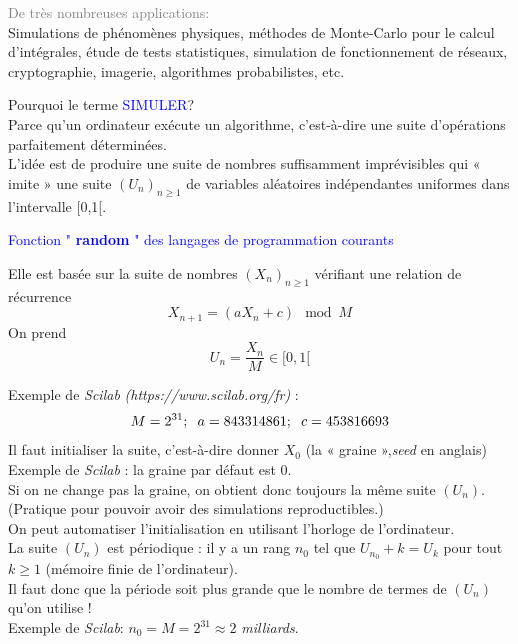 \textcolor{gray}{De très nombreuses applications: \\}
Simulations de phénomènes physiques, méthodes de
Monte-Carlo pour le calcul d'intégrales, étude de tests
statistiques, simulation de fonctionnement de réseaux,
cryptographie, imagerie, algorithmes probabilistes, etc. \\
\vspace{0.5cm}

Pourquoi le terme \textcolor{blue}{SIMULER}? \\
Parce qu'un ordinateur exécute un algorithme, c'est-à-dire une suite d'opérations parfaitement déterminées.\\
L'idée est de produire une suite de nombres suffisamment
imprévisibles qui « imite » une suite $(U_{n})_{n \geq 1}$ de variables aléatoires indépendantes uniformes dans l'intervalle [0,1[.\\

\vspace{1cm}

\begin{Large}
\colorbox{gray!20}{\textcolor{blue}{Fonction " \textbf{random} " des langages de programmation
courants}}
\end{Large}

Elle est basée sur la suite de nombres $(X_{n})_{n \geq 1}$ vérifiant une relation de récurrence
\[ X_{n+1} = (a X_{n}+ c) \mod M \]
On prend
\[ U_{n} = \dfrac{X_{n}}{M} \in [0,1[ \]

Exemple de \textit{Scilab} \emph{(https://www.scilab.org/fr)} : \\
\[ M = 2^{31} ; \hspace{2mm} a= 843 314 861; \hspace{2mm} c= 453 816 693 \]
\vspace{2mm}
Il faut initialiser la suite, c'est-à-dire donner $X_{0}$ (la « graine »,\textit{seed} en anglais)\\
\vspace{1mm}
Exemple de \textit{Scilab} : la graine par défaut est 0.\\
\vspace{1mm}
Si on ne change pas la graine, on obtient donc toujours la même suite $(U_{n})$. (Pratique pour pouvoir avoir des simulations reproductibles.)\\
\vspace{1mm}
On peut automatiser l'initialisation en utilisant l'horloge de l'ordinateur.\\
\vspace{1mm}
La suite $(U_{n})$ est périodique : il y a un rang $n_{0}$ tel que $U_{n_{0}} +k = U_{k}$ pour tout $k \geq 1$ (mémoire finie de l'ordinateur).\\
\vspace{1mm}
Il faut donc que la période soit plus grande que le nombre de termes de $(U_{n})$ qu'on utilise !\\
\vspace{1mm}
Exemple de \textit{Scilab}: $n_{0} = M = 2^{31} \approx 2$ \textit{milliards}. \\


